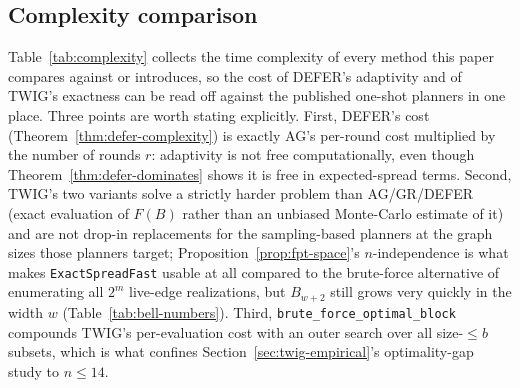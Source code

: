\documentclass[ijoc,sglanonrev]{informs4}
\newcommand{\FF}{F}
\begin{document}
\subsection{Complexity comparison}\label{sec:complexity-comparison}

Table~\ref{tab:complexity} collects the time complexity of every method
this paper compares against or introduces, so the cost of DEFER's
adaptivity and of TWIG's exactness can be read off against the published
one-shot planners in one place. Three points are worth stating explicitly.
First, DEFER's cost (Theorem~\ref{thm:defer-complexity}) is exactly AG's
per-round cost multiplied by the number of rounds $r$: adaptivity is not
free computationally, even though Theorem~\ref{thm:defer-dominates} shows
it is free in expected-spread terms. Second, TWIG's two variants solve a
strictly harder problem than AG/GR/DEFER (exact evaluation of $\FF(B)$
rather than an unbiased Monte-Carlo estimate of it) and are not drop-in
replacements for the sampling-based planners at the graph sizes those
planners target; Proposition~\ref{prop:fpt-space}'s
$n$-independence is what makes \texttt{ExactSpreadFast} usable at all
compared to the brute-force alternative of enumerating all $2^m$ live-edge
realizations, but $B_{w+2}$ still grows very quickly in the width $w$
(Table~\ref{tab:bell-numbers}). Third, \texttt{brute\_force\_optimal\_block}
compounds TWIG's per-evaluation cost with an outer search over all
size-$\le b$ subsets, which is what confines
Section~\ref{sec:twig-empirical}'s optimality-gap study to $n\le14$.
\end{document}
